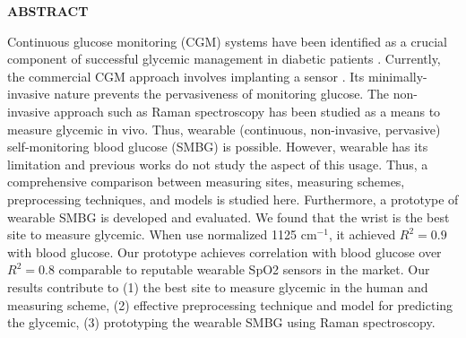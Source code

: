 {}

\begin{center}
    \large{\bf ABSTRACT}
\end{center}

\begin{sloppypar}
Continuous glucose monitoring (CGM) systems have been identified as a crucial component of successful glycemic management in diabetic patients \citep{continuous2021}.
Currently, the commercial CGM approach involves implanting a sensor \citep{CGMminimalinvasive}.
Its minimally-invasive nature prevents the pervasiveness of monitoring glucose.
The non-invasive approach such as Raman spectroscopy has been studied as a means to measure glycemic in vivo.
Thus, wearable (continuous, non-invasive, pervasive) self-monitoring blood glucose (SMBG) is possible.
However, wearable has its limitation and previous works do not study the aspect of this usage. 
Thus, a comprehensive comparison between measuring sites, measuring schemes, preprocessing techniques, and models is studied here.
Furthermore, a prototype of wearable SMBG is developed and evaluated.
We found that the wrist is the best site to measure glycemic. 
When use normalized 1125 $\text{cm}^{-1}$, it achieved $R^2 = 0.9$ with blood glucose.
Our prototype achieves correlation with blood glucose over $R^2 = 0.8$ comparable to reputable wearable SpO2 sensors in the market. 
Our results contribute to (1) the best site to measure glycemic in the human and measuring scheme, 
(2) effective preprocessing technique and model for predicting the glycemic,
(3) prototyping the wearable SMBG using Raman spectroscopy.
\end{sloppypar}
